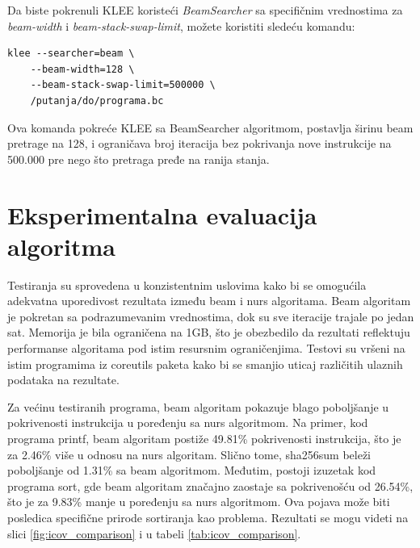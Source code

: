 \documentclass[a4paper]{article}
\begin{document}
Da biste pokrenuli KLEE koristeći \emph{BeamSearcher} sa specifičnim vrednostima za \emph{beam-width} i \emph{beam-stack-swap-limit}, možete koristiti sledeću komandu:

\begin{verbatim}
klee --searcher=beam \
    --beam-width=128 \
    --beam-stack-swap-limit=500000 \
    /putanja/do/programa.bc
\end{verbatim}

Ova komanda pokreće KLEE sa BeamSearcher algoritmom, postavlja širinu beam pretrage na 128, i ograničava broj iteracija bez pokrivanja nove instrukcije na 500.000 pre nego što pretraga pređe na ranija stanja.

\section{Eksperimentalna evaluacija algoritma}

Testiranja su sprovedena u konzistentnim uslovima kako bi se omogućila adekvatna uporedivost rezultata između beam i nurs algoritama. Beam algoritam je pokretan sa podrazumevanim vrednostima, dok su sve iteracije trajale po jedan sat. Memorija je bila ograničena na 1GB, što je obezbedilo da rezultati reflektuju performanse algoritama pod istim resursnim ograničenjima. Testovi su vršeni na istim programima iz coreutils paketa kako bi se smanjio uticaj različitih ulaznih podataka na rezultate.

Za većinu testiranih programa, beam algoritam pokazuje blago poboljšanje u pokrivenosti instrukcija u poređenju sa nurs algoritmom. Na primer, kod programa printf, beam algoritam postiže 49.81\% pokrivenosti instrukcija, što je za 2.46\% više u odnosu na nurs algoritam. Slično tome, sha256sum beleži poboljšanje od 1.31\% sa beam algoritmom.
Međutim, postoji izuzetak kod programa sort, gde beam algoritam značajno zaostaje sa pokrivenošću od 26.54\%, što je za 9.83\% manje u poređenju sa nurs algoritmom. Ova pojava može biti posledica specifične prirode sortiranja kao problema. Rezultati se mogu videti na slici \ref{fig:icov_comparison} i u tabeli \ref{tab:icov_comparison}.
\end{document}
